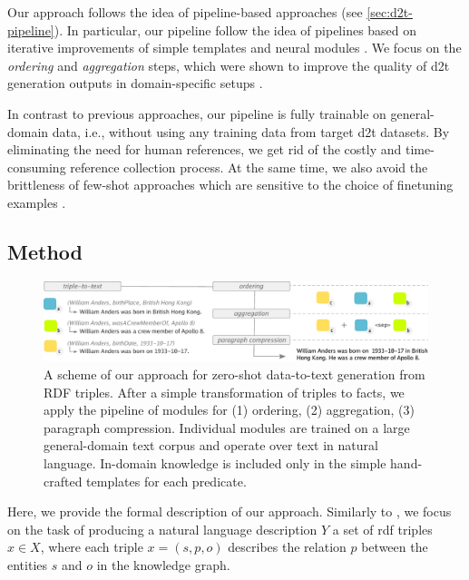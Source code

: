 Our approach follows the idea of pipeline-based approaches (see \autoref{sec:d2t-pipeline}). In particular, our pipeline follow the idea of pipelines based on iterative improvements of simple templates  \cite{laha2020scalable} and neural modules \cite{ferreiraNeuralDatatotextGeneration2019}. We focus on the \emph{ordering} and \emph{aggregation} steps, which were shown to improve the quality of \ac{d2t} generation outputs in domain-specific setups \cite{moryossef2019improving,moryossef2019step,trisedyaSentenceGenerationEntity2020,su2021plan}.

In contrast to previous approaches, our pipeline is fully trainable on general-domain data, i.e., without using any training data from target \ac{d2t} datasets. By eliminating the need for human references, we get rid of the costly and time-consuming reference collection process. At the same time, we also avoid the brittleness of few-shot approaches which are sensitive to the choice of finetuning examples \cite{chenFewShotNLGPreTrained2019,suFewShotTabletoTextGeneration2021,changSelectGenChallengeFinding2021}.

\subsection{Method}

\begin{figure}[t]
    \centering
    \includegraphics[width=\textwidth]{img/zeroshot_pipeline.pdf}
    \caption{A scheme of our approach for zero-shot data-to-text generation from RDF triples. After a simple transformation of triples to facts, we apply the pipeline of modules for (1) ordering, (2) aggregation, (3) paragraph compression. Individual modules are trained on a large general-domain text corpus and operate over text in natural language. In-domain knowledge is included only in the simple hand-crafted templates for each predicate.}\label{fig:zeroshot:pipeline}
\end{figure}
Here, we provide the formal description of our approach. Similarly to , we focus on the task of producing a natural language description $Y$ a set of \ac{rdf} triples $x \in X$, where each triple $x = (s, p, o)$ describes the relation $p$ between the entities $s$ and $o$ in the knowledge graph.

